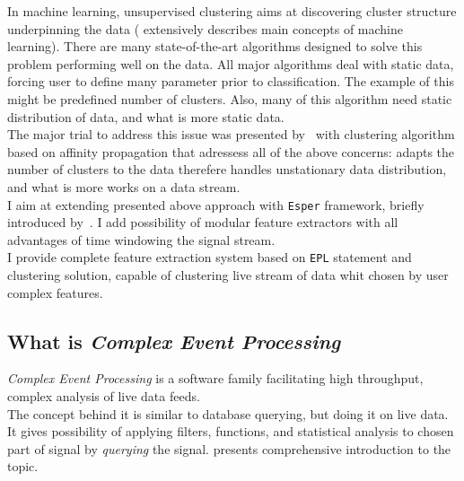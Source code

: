\documentclass[11pt, letterpaper]{article}            %
\begin{document}
In machine learning, unsupervised clustering aims at discovering cluster structure underpinning the data (\citep{Flach:2012:MLA:2490546} extensively describes main concepts of machine learning). There are many state-of-the-art algorithms designed to solve this problem performing well on the data. All major algorithms deal with static data, forcing user to define many parameter prior to classification. The example of this might be predefined number of clusters. Also, many of this algorithm need static distribution of data, and what is more static data.\\
The major trial to address this issue was presented by~\citep{zhang2013data} with clustering algorithm based on affinity propagation that adressess all of the above concerns: adapts the number of clusters to the data therefere handles unstationary data distribution, and what is more works on a data stream.\\
I aim at extending presented above approach with \texttt{Esper} framework, briefly introduced by~\citep{Marinescu2006}. I add possibility of modular feature extractors with all advantages of time windowing the signal stream.\\
I provide complete feature extraction system based on \texttt{EPL} statement and clustering solution, capable of clustering live stream of data whit chosen by user complex features.\\



\subsection{What is \emph{Complex Event Processing}}
\emph{Complex Event Processing} is a software family facilitating high throughput, complex analysis of live data feeds.\\
The concept behind it is similar to database querying, but doing it on live data. It gives possibility of applying filters, functions, and statistical analysis to chosen part of signal by \emph{querying} the signal. \citep{Etzion:2010:EPA:1894960} presents comprehensive introduction to the topic.
\end{document}
